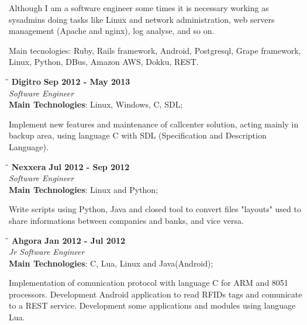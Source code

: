 \documentclass[margin]{res}
\begin{document}
\begin{resume}
Although I am a software engineer some times it is necessary working as sysadmins doing tasks like Linux and network administration, web servers management (Apache and nginx), log analyse, and so on.

Main tecnologies: Ruby, Rails framework, Android, Postgresql, Grape framework, Linux, Python, DBus, Amazon AWS, Dokku, REST.

\vspace{-0.1in}
   \begin{tabbing}
   \hspace{2.3in}\= \hspace{1.7in}\= \kill %
    \textbf{Digitro}    \>\>\textbf{Sep 2012 - May 2013}\\
    \textit{Software Engineer}\\
    \textbf{Main Technologies}: Linux, Windows, C, SDL;
   \end{tabbing}\vspace{-20pt}      %
    \vspace{2mm}
Implement new features and maintenance of callcenter solution, acting mainly
in backup area, using language C with SDL (Specification and Description Language).


   \begin{tabbing}
   \hspace{2.3in}\= \hspace{1.7in}\= \kill %
    \textbf{Nexxera}    \>\>\textbf{Jul 2012 - Sep 2012}\\
    \textit{Software Engineer}\\
    \textbf{Main Technologies}: Linux and Python;
   \end{tabbing}\vspace{-20pt}      %
    \vspace{2mm}

    Write scripts using Python, Java and closed tool to convert files "layouts" used to share informations between companies and banks, and vice versa.

   \begin{tabbing}
   \hspace{2.3in}\= \hspace{1.5in}\= \kill %
    \textbf{Ahgora}    \>\>\textbf{Jan 2012 - Jul 2012}\\
    \textit{Jr Software Engineer}\\
    \textbf{Main Technologies}: C, Lua, Linux and Java(Android);
   \end{tabbing}\vspace{-20pt}      %
    \vspace{2mm}
Implementation of comunication protocol with language C for ARM and 8051 processors.
Development Android application to read RFIDs tags and comunicate to a REST service.
Development some applications and modules using language Lua.



\end{resume}
\end{document}
